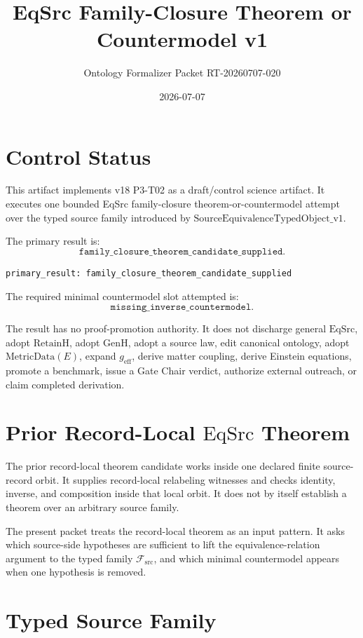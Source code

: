 \documentclass[11pt]{article}
\title{EqSrc Family-Closure Theorem or Countermodel v1}
\author{Ontology Formalizer Packet RT-20260707-020}
\date{2026-07-07}
\newcommand{\EqSrc}{\mathrm{EqSrc}}
\newcommand{\RetainH}{\mathrm{RetainH}}
\newcommand{\GenH}{\mathrm{GenH}}
\newcommand{\Fsrc}{\mathcal{F}_{\mathrm{src}}}
\begin{document}
\maketitle

\section{Control Status}

This artifact implements v18 P3-T02 as a draft/control science artifact. It
executes one bounded EqSrc family-closure theorem-or-countermodel attempt over
the typed source family introduced by
\(\mathrm{SourceEquivalenceTypedObject\_v1}\).

The primary result is:
\[
  \texttt{family\_closure\_theorem\_candidate\_supplied}.
\]

\begin{verbatim}
primary_result: family_closure_theorem_candidate_supplied
\end{verbatim}

The required minimal countermodel slot attempted is:
\[
  \texttt{missing\_inverse\_countermodel}.
\]

The result has no proof-promotion authority. It does not discharge general
\(\EqSrc\), adopt \(\RetainH\), adopt \(\GenH\), adopt a source law, edit
canonical ontology, adopt \(\mathrm{MetricData}(E)\), expand
\(g_{\mathrm{eff}}\), derive matter coupling, derive Einstein equations,
promote a benchmark, issue a Gate Chair verdict, authorize external outreach,
or claim completed derivation.

\section{Prior Record-Local \(\EqSrc\) Theorem}

The prior record-local theorem candidate works inside one declared finite
source-record orbit. It supplies record-local relabeling witnesses and checks
identity, inverse, and composition inside that local orbit. It does not by
itself establish a theorem over an arbitrary source family.

The present packet treats the record-local theorem as an input pattern. It asks
which source-side hypotheses are sufficient to lift the equivalence-relation
argument to the typed family \(\Fsrc\), and which minimal countermodel appears
when one hypothesis is removed.

\section{Typed Source Family}
\end{document}
